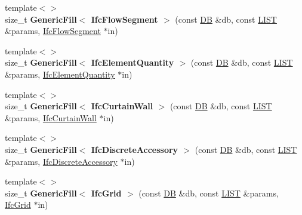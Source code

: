 \begin{DoxyCompactItemize}
\item 
\hypertarget{namespace_assimp_1_1_s_t_e_p_a9cff8697a7084d697e9d79ebe54f1cea}{{\footnotesize template$<$$>$ }\\size\+\_\+t {\bfseries Generic\+Fill$<$ Ifc\+Flow\+Segment $>$} (const \hyperlink{class_assimp_1_1_s_t_e_p_1_1_d_b}{D\+B} \&db, const \hyperlink{class_assimp_1_1_s_t_e_p_1_1_e_x_p_r_e_s_s_1_1_l_i_s_t}{L\+I\+S\+T} \&params, \hyperlink{struct_assimp_1_1_i_f_c_1_1_ifc_flow_segment}{Ifc\+Flow\+Segment} $\ast$in)}\label{namespace_assimp_1_1_s_t_e_p_a9cff8697a7084d697e9d79ebe54f1cea}

\item 
\hypertarget{namespace_assimp_1_1_s_t_e_p_a2ebef45838e1865725e6e60cc4bb398b}{{\footnotesize template$<$$>$ }\\size\+\_\+t {\bfseries Generic\+Fill$<$ Ifc\+Element\+Quantity $>$} (const \hyperlink{class_assimp_1_1_s_t_e_p_1_1_d_b}{D\+B} \&db, const \hyperlink{class_assimp_1_1_s_t_e_p_1_1_e_x_p_r_e_s_s_1_1_l_i_s_t}{L\+I\+S\+T} \&params, \hyperlink{struct_assimp_1_1_i_f_c_1_1_ifc_element_quantity}{Ifc\+Element\+Quantity} $\ast$in)}\label{namespace_assimp_1_1_s_t_e_p_a2ebef45838e1865725e6e60cc4bb398b}

\item 
\hypertarget{namespace_assimp_1_1_s_t_e_p_aac918f140c802548d968616042ecd7bc}{{\footnotesize template$<$$>$ }\\size\+\_\+t {\bfseries Generic\+Fill$<$ Ifc\+Curtain\+Wall $>$} (const \hyperlink{class_assimp_1_1_s_t_e_p_1_1_d_b}{D\+B} \&db, const \hyperlink{class_assimp_1_1_s_t_e_p_1_1_e_x_p_r_e_s_s_1_1_l_i_s_t}{L\+I\+S\+T} \&params, \hyperlink{struct_assimp_1_1_i_f_c_1_1_ifc_curtain_wall}{Ifc\+Curtain\+Wall} $\ast$in)}\label{namespace_assimp_1_1_s_t_e_p_aac918f140c802548d968616042ecd7bc}

\item 
\hypertarget{namespace_assimp_1_1_s_t_e_p_a64c89d1047fd8e7e6936cccda4bd73ce}{{\footnotesize template$<$$>$ }\\size\+\_\+t {\bfseries Generic\+Fill$<$ Ifc\+Discrete\+Accessory $>$} (const \hyperlink{class_assimp_1_1_s_t_e_p_1_1_d_b}{D\+B} \&db, const \hyperlink{class_assimp_1_1_s_t_e_p_1_1_e_x_p_r_e_s_s_1_1_l_i_s_t}{L\+I\+S\+T} \&params, \hyperlink{struct_assimp_1_1_i_f_c_1_1_ifc_discrete_accessory}{Ifc\+Discrete\+Accessory} $\ast$in)}\label{namespace_assimp_1_1_s_t_e_p_a64c89d1047fd8e7e6936cccda4bd73ce}

\item 
\hypertarget{namespace_assimp_1_1_s_t_e_p_a40a04a76ab19b67297d0085c89b40cb6}{{\footnotesize template$<$$>$ }\\size\+\_\+t {\bfseries Generic\+Fill$<$ Ifc\+Grid $>$} (const \hyperlink{class_assimp_1_1_s_t_e_p_1_1_d_b}{D\+B} \&db, const \hyperlink{class_assimp_1_1_s_t_e_p_1_1_e_x_p_r_e_s_s_1_1_l_i_s_t}{L\+I\+S\+T} \&params, \hyperlink{struct_assimp_1_1_i_f_c_1_1_ifc_grid}{Ifc\+Grid} $\ast$in)}\label{namespace_assimp_1_1_s_t_e_p_a40a04a76ab19b67297d0085c89b40cb6}


\end{DoxyCompactItemize}
